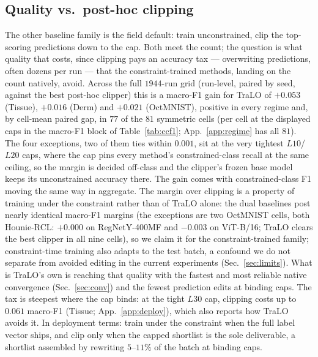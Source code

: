 \documentclass[10pt]{article}
\begin{document}
\subsection{Quality vs.\ post-hoc clipping}
\label{sec:deploy}

The other baseline family is the field default: train unconstrained, clip
the top-scoring predictions down to the cap. %
{Both meet the count; the question is what quality that costs,
since clipping pays an accuracy tax --- overwriting predictions, often dozens
per run --- that the constraint-trained methods, landing on the count natively,
avoid.}
Across the full $1944$-run grid (run-level, paired by seed, against the
best post-hoc clipper) this is a macro-F1 gain for TraLO of $+0.053$
(Tissue), $+0.016$ (Derm) and $+0.021$ (OctMNIST), positive in every
regime and, by cell-mean paired gap, in $77$ of the $81$ symmetric cells
(per cell at the displayed caps in the macro-F1 block of
Table~\ref{tab:ccf1}; App.~\ref{app:regime} has all $81$). The four
exceptions, two of them ties within $0.001$, sit at the very tightest
$L10$/$L20$ caps, where the cap pins every method's constrained-class
recall at the same ceiling, so the margin is decided off-class and the
clipper's frozen base model keeps its unconstrained accuracy there. The
gain comes with constrained-class F1 moving the same way in aggregate.
The margin over clipping is a property of training under the constraint
rather than of TraLO alone: the dual baselines post nearly identical
macro-F1 margins {(the
exceptions are two OctMNIST cells, both Hounie-RCL: $+0.000$ on RegNetY-400MF and
$-0.003$ on ViT-B/16; TraLO clears the best clipper in all nine cells)}, so we
claim it for the constraint-trained family; constraint-time training also
adapts to the test batch, a confound we do not separate from avoided
editing in the current experiments (Sec.~\ref{sec:limits}). What is
TraLO's own is reaching that quality with the fastest and most reliable
native convergence (Sec.~\ref{sec:conv}) and the fewest prediction edits
at binding caps. The tax is steepest where the cap binds: at the tight
$L30$ cap, clipping costs up to $0.061$ macro-F1 (Tissue;
App.~\ref{app:deploy}{), which also
reports how TraLO avoids it.} In deployment terms:
train under the constraint when the full label vector ships, and clip only
when the capped shortlist is the sole deliverable, a shortlist assembled
by rewriting $5$--$11\%$ of the batch at binding caps.
\end{document}
